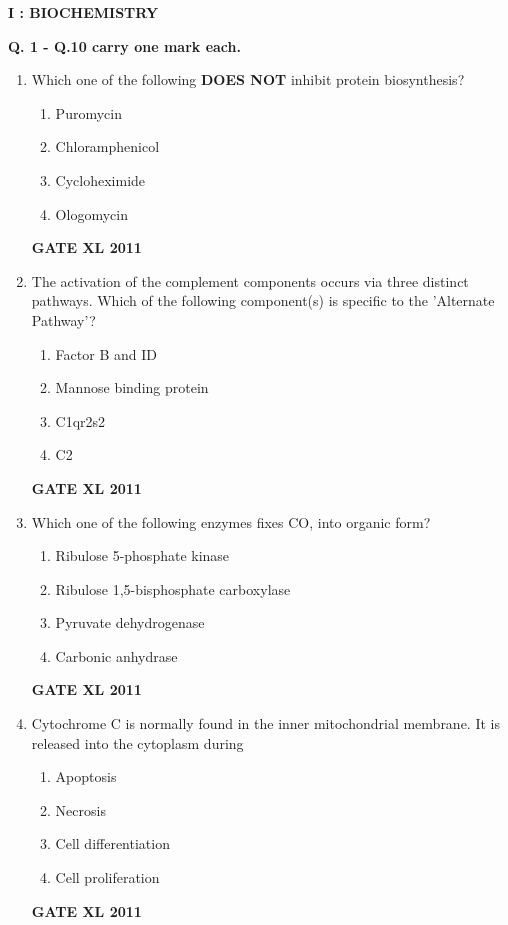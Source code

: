 \documentclass[journal,12pt,onecolumn]{IEEEtran}
\begin{document}
\begin{center}
\textbf{ I : BIOCHEMISTRY}

\textbf{Q. 1 - Q.10 carry one mark each.}

\end{center}
\begin{enumerate}
	\item {Which one of the following \textbf{DOES NOT} inhibit protein biosynthesis?} 
		\begin{multicols}{4}
		\begin{enumerate}
			\item Puromycin	
			\item Chloramphenicol	
			\item Cycloheximide	
			\item Ologomycin
		\end{enumerate}
		\end{multicols}
		\hfill{\textbf{GATE XL 2011}}
	\item {The activation of the complement components occurs via three distinct pathways. Which of the following component(s) is specific to the 'Alternate Pathway'?}
	\begin{enumerate}
			\item Factor B and ID
			\item Mannose binding protein
			\item C1qr2s2
			\item C2
		\end{enumerate}
		\hfill{\textbf{GATE XL 2011}}

	\item {Which one of the following enzymes fixes CO, into organic form?}
		\begin{enumerate}
			\item Ribulose 5-phosphate kinase
			\item Ribulose 1,5-bisphosphate carboxylase
			\item Pyruvate dehydrogenase
			\item Carbonic anhydrase
		\end{enumerate}
		\hfill{\textbf{GATE XL 2011}}

	\item {Cytochrome C is normally found in the inner mitochondrial membrane. It is released into the cytoplasm during}
	\begin{enumerate}
			\item Apoptosis
			\item Necrosis
			\item Cell differentiation
			\item Cell proliferation
		\end{enumerate}
		\hfill{\textbf{GATE XL 2011}}


\end{enumerate}
\end{document}
